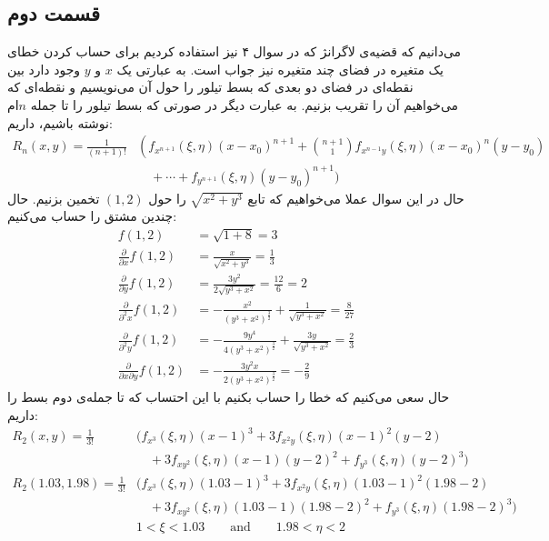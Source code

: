 \documentclass[]{article}
\begin{document}
\subsection*{قسمت دوم}
می‌دانیم که قضیه‌ی لاگرانژ که در سوال ۴ نیز استفاده کردیم برای حساب کردن خطای یک متغیره
در فضای چند متغیره نیز جواب است. به عبارتی یک
$x$ و $y$
وجود دارد بین نقطه‌ای در فضای دو بعدی که بسط تیلور را حول آن می‌نویسیم و نقطه‌ای که می‌خواهیم
آن را تقریب بزنیم. به عبارت دیگر در صورتی که بسط تیلور را تا جمله $n$ام نوشته باشیم، داریم:
\begin{align*}
    R_n(x,y)=\frac{1}{(n+1)!}&\left(f_{x^{n+1}}(\xi,\eta)(x-x_0)^{n+1}+\binom{n+1}{1}f_{x^{n-1}y}(\xi,\eta)(x-x_0)^n(y-y_0)\right.\\
    &\quad+\cdots+f_{y^{n+1}}(\xi,\eta)(y-y_0)^{n+1}\Big)
\end{align*}
حال در این سوال عملا می‌خواهیم که تابع
$\sqrt{x^2+y^3}$
را حول
$(1, 2)$
تخمین بزنیم. حال چندین مشتق را حساب می‌کنیم:
\begin{align*}
    f(1,2) &= \sqrt{1 + 8} = 3\\
    \frac{\partial}{\partial x} f(1,2) &= \frac{x}{\sqrt{x^{2}+y^{3}}} = \frac{1}{3}\\
    \frac{\partial}{\partial y} f(1,2) &= \frac{3 y^{2}}{2 \sqrt{y^{3}+x^{2}}} = \frac{12}{6} = 2\\
    \frac{\partial}{\partial^2 x} f(1,2) &= -\frac{x^{2}}{\left(y^{3}+x^{2}\right)^{\frac{3}{2}}}+\frac{1}{\sqrt{y^{3}+x^{2}}} = \frac{8}{27}\\
    \frac{\partial}{\partial^2 y} f(1,2) &= -\frac{9 y^{4}}{4 \left(y^{3}+x^{2}\right)^{\frac{3}{2}}}+\frac{3 y}{\sqrt{y^{3}+x^{2}}} = \frac{2}{3}\\
    \frac{\partial}{\partial x \partial y} f(1,2) &= -\frac{3 y^{2} x}{2 \left(y^{3}+x^{2}\right)^{\frac{3}{2}}} = -\frac{2}{9}
\end{align*}
حال سعی می‌کنیم که خطا را حساب بکنیم با این احتساب که تا جمله‌ی دوم بسط را داریم:
\begin{align*}
    R_2(x,y)=\frac{1}{3!}&\Big(f_{x^3}(\xi,\eta)(x-1)^{3}+3f_{x^2y}(\xi,\eta)(x-1)^2(y-2)\\
    &\quad+3f_{xy^2}(\xi,\eta)(x-1)(y-2)^2 + f_{y^3}(\xi,\eta)(y-2)^3\Big)\\
    R_2(1.03,1.98)=\frac{1}{3!}&\Big(f_{x^3}(\xi,\eta)(1.03-1)^{3}+3f_{x^2y}(\xi,\eta)(1.03-1)^2(1.98-2)\\
    &\quad+3f_{xy^2}(\xi,\eta)(1.03-1)(1.98-2)^2 + f_{y^3}(\xi,\eta)(1.98-2)^3\Big)\\
    &1 < \xi < 1.03 \qquad \text{and} \qquad 1.98 < \eta < 2
\end{align*}
\end{document}

